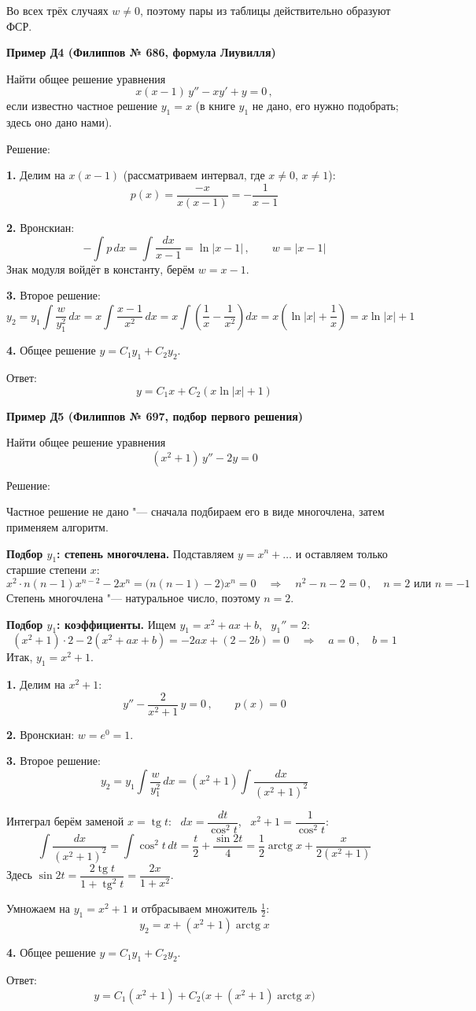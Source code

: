 \documentclass[11pt,a4paper]{article}
\newcommand{\example}[1]{\par\medskip\noindent\textbf{#1}\par\nopagebreak\smallskip}
\begin{document}
Во всех трёх случаях $w \ne 0$, поэтому пары из таблицы действительно образуют ФСР.

\example{Пример Д4 (Филиппов № 686, формула Лиувилля)}

Найти общее решение уравнения
\[
  x(x - 1)\, y'' - x y' + y = 0\,,
\]
если известно частное решение $y_1 = x$ (в книге $y_1$ не дано, его нужно подобрать; здесь оно дано нами).

Решение:

\textbf{1.} Делим на $x(x - 1)$ (рассматриваем интервал, где $x \ne 0$, $x \ne 1$):
\[
  p(x) = \frac{-x}{x(x - 1)} = -\frac{1}{x - 1}
\]

\textbf{2.} Вронскиан:
\[
  -\int p\,dx = \int \frac{dx}{x - 1} = \ln|x - 1|\,, \qquad
  w = |x - 1|
\]
Знак модуля войдёт в константу, берём $w = x - 1$.

\textbf{3.} Второе решение:
\[
  y_2 = y_1 \int \frac{w}{y_1^2}\,dx = x \int \frac{x - 1}{x^2}\,dx
  = x \int \left(\frac1x - \frac{1}{x^2}\right) dx
  = x\left(\ln|x| + \frac1x\right) = x\ln|x| + 1
\]

\textbf{4.} Общее решение $y = C_1 y_1 + C_2 y_2$.

Ответ:
\[
  y = C_1 x + C_2 (x\ln|x| + 1)
\]

\example{Пример Д5 (Филиппов № 697, подбор первого решения)}

Найти общее решение уравнения
\[
  (x^2 + 1)\, y'' - 2y = 0
\]

Решение:

Частное решение не дано "--- сначала подбираем его в виде многочлена, затем применяем алгоритм.

\textbf{Подбор $y_1$: степень многочлена.} Подставляем $y = x^n + \dots$ и оставляем только старшие степени $x$:
\[
  x^2 \cdot n(n - 1)x^{n-2} - 2x^n = \bigl(n(n - 1) - 2\bigr)x^n = 0
  \quad\Rightarrow\quad
  n^2 - n - 2 = 0\,, \quad n = 2 \text{ или } n = -1
\]
Степень многочлена "--- натуральное число, поэтому $n = 2$.

\textbf{Подбор $y_1$: коэффициенты.} Ищем $y_1 = x^2 + ax + b$, \ $y_1'' = 2$:
\[
  (x^2 + 1) \cdot 2 - 2(x^2 + ax + b) = -2ax + (2 - 2b) = 0
  \quad\Rightarrow\quad
  a = 0\,, \quad b = 1
\]
Итак, $y_1 = x^2 + 1$.

\textbf{1.} Делим на $x^2 + 1$:
\[
  y'' - \frac{2}{x^2 + 1}\, y = 0\,, \qquad p(x) = 0
\]

\textbf{2.} Вронскиан: $w = e^{0} = 1$.

\textbf{3.} Второе решение:
\[
  y_2 = y_1 \int \frac{w}{y_1^2}\,dx = (x^2 + 1) \int \frac{dx}{(x^2 + 1)^2}
\]

Интеграл берём заменой $x = \operatorname{tg} t$: \ $dx = \dfrac{dt}{\cos^2 t}$, \ $x^2 + 1 = \dfrac{1}{\cos^2 t}$:
\[
  \int \frac{dx}{(x^2 + 1)^2} = \int \cos^2 t\,dt = \frac{t}{2} + \frac{\sin 2t}{4}
  = \frac12 \operatorname{arctg} x + \frac{x}{2(x^2 + 1)}
\]
Здесь $\sin 2t = \dfrac{2\operatorname{tg} t}{1 + \operatorname{tg}^2 t} = \dfrac{2x}{1 + x^2}$.

Умножаем на $y_1 = x^2 + 1$ и отбрасываем множитель $\frac12$:
\[
  y_2 = x + (x^2 + 1)\operatorname{arctg} x
\]

\textbf{4.} Общее решение $y = C_1 y_1 + C_2 y_2$.

Ответ:
\[
  y = C_1 (x^2 + 1) + C_2 \bigl(x + (x^2 + 1)\operatorname{arctg} x\bigr)
\]
\end{document}
